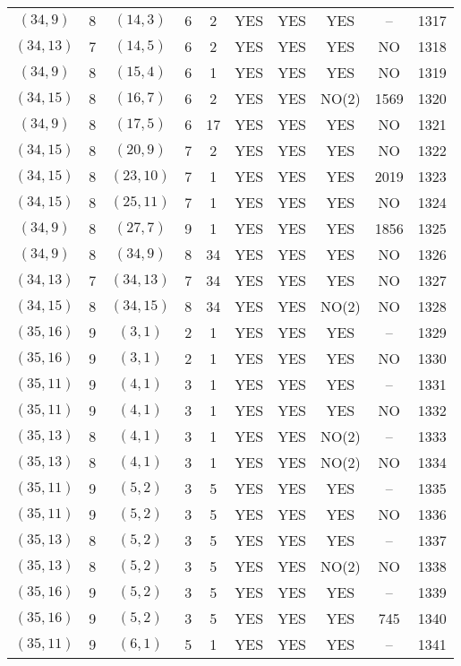 \begin{longtable}{|c|c|c|c|c|c|c|c|c|c|}
$(34, 9)$ & 8 & $(14, 3)$ & 6 & 2 & YES & YES & YES & -- & 1317\\
$(34, 13)$ & 7 & $(14, 5)$ & 6 & 2 & YES & YES & YES & NO & 1318\\
$(34, 9)$ & 8 & $(15, 4)$ & 6 & 1 & YES & YES & YES & NO & 1319\\
$(34, 15)$ & 8 & $(16, 7)$ & 6 & 2 & YES & YES & NO(2) & 1569 & 1320\\
$(34, 9)$ & 8 & $(17, 5)$ & 6 & 17 & YES & YES & YES & NO & 1321\\
$(34, 15)$ & 8 & $(20, 9)$ & 7 & 2 & YES & YES & YES & NO & 1322\\
$(34, 15)$ & 8 & $(23, 10)$ & 7 & 1 & YES & YES & YES & 2019 & 1323\\
$(34, 15)$ & 8 & $(25, 11)$ & 7 & 1 & YES & YES & YES & NO & 1324\\
$(34, 9)$ & 8 & $(27, 7)$ & 9 & 1 & YES & YES & YES & 1856 & 1325\\
$(34, 9)$ & 8 & $(34, 9)$ & 8 & 34 & YES & YES & YES & NO & 1326\\
$(34, 13)$ & 7 & $(34, 13)$ & 7 & 34 & YES & YES & YES & NO & 1327\\
$(34, 15)$ & 8 & $(34, 15)$ & 8 & 34 & YES & YES & NO(2) & NO & 1328\\
$(35, 16)$ & 9 & $(3, 1)$ & 2 & 1 & YES & YES & YES & -- & 1329\\
$(35, 16)$ & 9 & $(3, 1)$ & 2 & 1 & YES & YES & YES & NO & 1330\\
$(35, 11)$ & 9 & $(4, 1)$ & 3 & 1 & YES & YES & YES & -- & 1331\\
$(35, 11)$ & 9 & $(4, 1)$ & 3 & 1 & YES & YES & YES & NO & 1332\\
$(35, 13)$ & 8 & $(4, 1)$ & 3 & 1 & YES & YES & NO(2) & -- & 1333\\
$(35, 13)$ & 8 & $(4, 1)$ & 3 & 1 & YES & YES & NO(2) & NO & 1334\\
$(35, 11)$ & 9 & $(5, 2)$ & 3 & 5 & YES & YES & YES & -- & 1335\\
$(35, 11)$ & 9 & $(5, 2)$ & 3 & 5 & YES & YES & YES & NO & 1336\\
$(35, 13)$ & 8 & $(5, 2)$ & 3 & 5 & YES & YES & YES & -- & 1337\\
$(35, 13)$ & 8 & $(5, 2)$ & 3 & 5 & YES & YES & NO(2) & NO & 1338\\
$(35, 16)$ & 9 & $(5, 2)$ & 3 & 5 & YES & YES & YES & -- & 1339\\
$(35, 16)$ & 9 & $(5, 2)$ & 3 & 5 & YES & YES & YES & 745 & 1340\\
$(35, 11)$ & 9 & $(6, 1)$ & 5 & 1 & YES & YES & YES & -- & 1341\\

\end{longtable}
